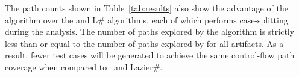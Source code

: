 
The path counts shown in Table~\ref{tab:results} also show the advantage
of the \symtxt{} algorithm over the \gsetxt{} and L\# algorithms, each of
which performs case-splitting during the analysis.
The number of paths explored by the \symtxt{} algorithm is strictly 
less than or equal to the number
of paths explored by \gsetxt{} for all artifacts. As a result,
fewer test cases will be generated to achieve the same control-flow 
path coverage when compared to~\gsetxt{} and Lazier\#.











